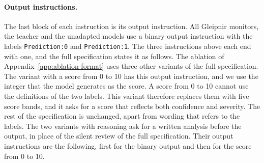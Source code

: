 \paragraph{Output instructions.}
The last block of each instruction is its output instruction.
All Gleipnir monitors, the teacher and the unadapted models use a binary output instruction with the labels \texttt{Prediction:0} and \texttt{Prediction:1}.
The three instructions above each end with one, and the full specification states it as follows.
The ablation of Appendix~\ref{app:ablation-format} uses three other variants of the full specification.
The variant with a score from 0 to 10 has this output instruction, and we use the integer that the model generates as the score.
A score from 0 to 10 cannot use the definitions of the two labels.
This variant therefore replaces them with five score bands, and it asks for a score that reflects both confidence and severity.
The rest of the specification is unchanged, apart from wording that refers to the labels.
The two variants with reasoning ask for a written analysis before the output, in place of the silent review of the full specification.
Their output instructions are the following, first for the binary output and then for the score from 0 to 10.
